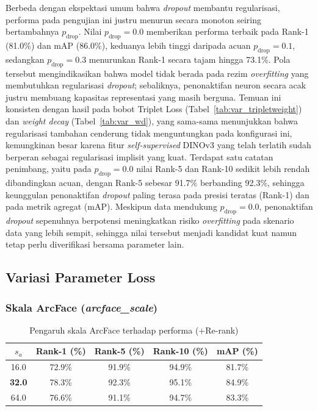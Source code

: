 Berbeda dengan ekspektasi umum bahwa \textit{dropout} membantu regularisasi, performa pada pengujian ini justru menurun secara monoton seiring bertambahnya $p_{\text{drop}}$. Nilai $p_{\text{drop}}=0{.}0$ memberikan performa terbaik pada Rank-1 (81.0\%) dan mAP (86.0\%), keduanya lebih tinggi daripada acuan $p_{\text{drop}}=0{.}1$, sedangkan $p_{\text{drop}}=0{.}3$ menurunkan Rank-1 secara tajam hingga 73.1\%. Pola tersebut mengindikasikan bahwa model tidak berada pada rezim \textit{overfitting} yang membutuhkan regularisasi \textit{dropout}; sebaliknya, penonaktifan neuron secara acak justru membuang kapasitas representasi yang masih berguna. Temuan ini konsisten dengan hasil pada bobot Triplet Loss (Tabel~\ref{tab:var_tripletweight}) dan \textit{weight decay} (Tabel~\ref{tab:var_wd}), yang sama-sama menunjukkan bahwa regularisasi tambahan cenderung tidak menguntungkan pada konfigurasi ini, kemungkinan besar karena fitur \textit{self-supervised} DINOv3 yang telah terlatih sudah berperan sebagai regularisasi implisit yang kuat. Terdapat satu catatan penimbang, yaitu pada $p_{\text{drop}}=0{.}0$ nilai Rank-5 dan Rank-10 sedikit lebih rendah dibandingkan acuan, dengan Rank-5 sebesar 91.7\% berbanding 92.3\%, sehingga keunggulan penonaktifan \textit{dropout} paling terasa pada presisi teratas (Rank-1) dan pada metrik agregat (mAP). Meskipun data mendukung $p_{\text{drop}}=0{.}0$, penonaktifan \textit{dropout} sepenuhnya berpotensi meningkatkan risiko \textit{overfitting} pada skenario data yang lebih sempit, sehingga nilai tersebut menjadi kandidat kuat namun tetap perlu diverifikasi bersama parameter lain.

\subsection{Variasi Parameter Loss}

\subsubsection{Skala ArcFace (\textit{arcface\_scale})}

\begin{table}[H]
    \centering
    \caption{Pengaruh skala ArcFace terhadap performa (+Re-rank)}
    \label{tab:var_arcscale}
    \renewcommand{\arraystretch}{1.25}
    \begin{tabular}{ccccc}
        \hline
        $s_a$           & \textbf{Rank-1 (\%)} & \textbf{Rank-5 (\%)} & \textbf{Rank-10 (\%)} & \textbf{mAP (\%)} \\
        \hline
        16{.}0          & 72.9\%               & 91.9\%               & 94.9\%                & 81.7\%            \\
        \textbf{32{.}0} & 78.3\%               & 92.3\%               & 95.1\%                & 84.9\%            \\
        64{.}0          & 76.6\%               & 91.1\%               & 94.7\%                & 83.3\%            \\
        \hline
    \end{tabular}
\end{table}

